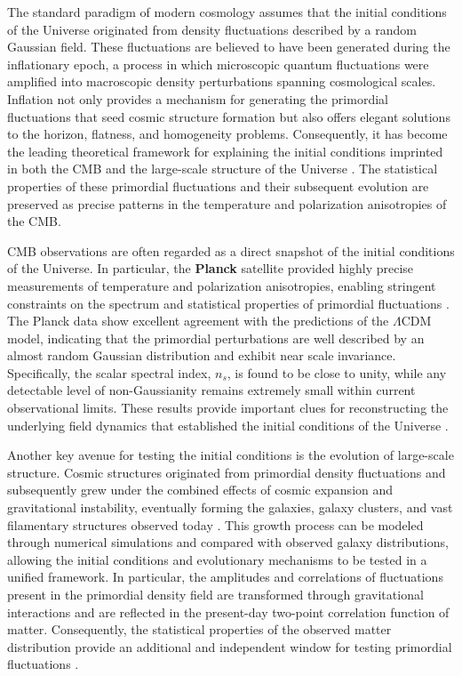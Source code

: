 The standard paradigm of modern cosmology assumes that the initial conditions of the Universe originated from density fluctuations described by a random Gaussian field. These fluctuations are believed to have been generated during the inflationary epoch, a process in which microscopic quantum fluctuations were amplified into macroscopic density perturbations spanning cosmological scales. Inflation not only provides a mechanism for generating the primordial fluctuations that seed cosmic structure formation but also offers elegant solutions to the horizon, flatness, and homogeneity problems. Consequently, it has become the leading theoretical framework for explaining the initial conditions imprinted in both the CMB and the large-scale structure of the Universe \cite{baumann2011}. The statistical properties of these primordial fluctuations and their subsequent evolution are preserved as precise patterns in the temperature and polarization anisotropies of the CMB.

CMB observations are often regarded as a direct snapshot of the initial conditions of the Universe. In particular, the \textbf{Planck} satellite provided highly precise measurements of temperature and polarization anisotropies, enabling stringent constraints on the spectrum and statistical properties of primordial fluctuations \cite{planck2020}. The Planck data show excellent agreement with the predictions of the $\Lambda$CDM model, indicating that the primordial perturbations are well described by an almost random Gaussian distribution and exhibit near scale invariance. Specifically, the scalar spectral index, $n_s$, is found to be close to unity, while any detectable level of non-Gaussianity remains extremely small within current observational limits. These results provide important clues for reconstructing the underlying field dynamics that established the initial conditions of the Universe \cite{planck2020}.

Another key avenue for testing the initial conditions is the evolution of large-scale structure. Cosmic structures originated from primordial density fluctuations and subsequently grew under the combined effects of cosmic expansion and gravitational instability, eventually forming the galaxies, galaxy clusters, and vast filamentary structures observed today \cite{peebles1980}. This growth process can be modeled through numerical simulations and compared with observed galaxy distributions, allowing the initial conditions and evolutionary mechanisms to be tested in a unified framework. In particular, the amplitudes and correlations of fluctuations present in the primordial density field are transformed through gravitational interactions and are reflected in the present-day two-point correlation function of matter. Consequently, the statistical properties of the observed matter distribution provide an additional and independent window for testing primordial fluctuations \cite{dodelson2003,springel2005}.

